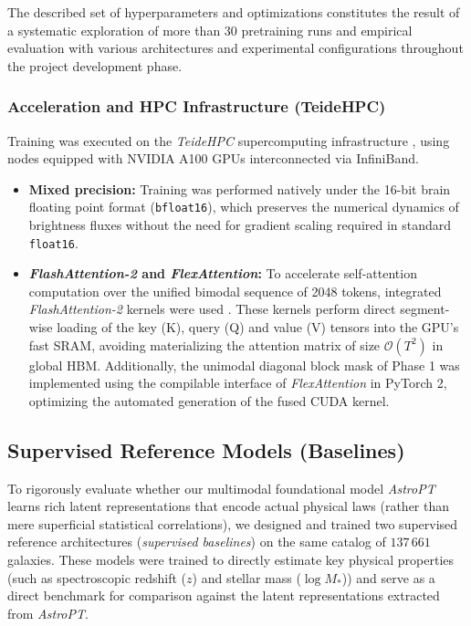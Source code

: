 The described set of hyperparameters and optimizations constitutes the result of a systematic exploration of more than 30 pretraining runs and empirical evaluation with various architectures and experimental configurations throughout the project development phase.

\subsubsection{Acceleration and HPC Infrastructure (TeideHPC)}

Training was executed on the \textit{TeideHPC} supercomputing infrastructure \autocite{ar:teidehpc}, using nodes equipped with NVIDIA A100 GPUs interconnected via InfiniBand.

\begin{itemize}
\item \textbf{Mixed precision:} Training was performed natively under the 16-bit brain floating point format (\texttt{bfloat16}), which preserves the numerical dynamics of brightness fluxes without the need for gradient scaling required in standard \texttt{float16}.
\item \textbf{\textit{FlashAttention-2} and \textit{FlexAttention}:} To accelerate self-attention computation over the unified bimodal sequence of 2048 tokens, integrated \textit{FlashAttention-2} kernels were used \autocite{ar:dao-2024}. These kernels perform direct segment-wise loading of the key (K), query (Q) and value (V) tensors into the GPU's fast SRAM, avoiding materializing the attention matrix of size $\mathcal{O}(T^2)$ in global HBM. Additionally, the unimodal diagonal block mask of Phase 1 was implemented using the compilable interface of \textit{FlexAttention} in PyTorch 2, optimizing the automated generation of the fused CUDA kernel.
\end{itemize}

\subsection{Supervised Reference Models (Baselines)}

To rigorously evaluate whether our multimodal foundational model \textit{AstroPT} learns rich latent representations that encode actual physical laws (rather than mere superficial statistical correlations), we designed and trained two supervised reference architectures (\textit{supervised baselines}) on the same catalog of $137\,661$ galaxies. These models were trained to directly estimate key physical properties (such as spectroscopic redshift ($z$) and stellar mass ($\log M_*$)) and serve as a direct benchmark for comparison against the latent representations extracted from \textit{AstroPT}.

